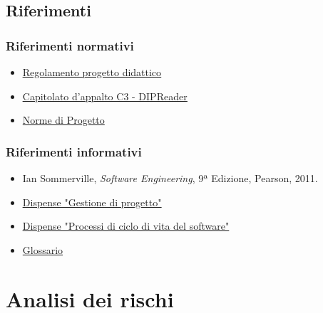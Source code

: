 \documentclass[a4paper,12pt]{article}
\begin{document}
\subsection{Riferimenti}
\subsubsection{Riferimenti normativi}
\begin{itemize}
    \item \href{https://www.math.unipd.it/~tullio/IS-1/2025/Dispense/PD1.pdf}{\ul{Regolamento progetto didattico}}  
    \item \href{https://www.math.unipd.it/~tullio/IS-1/2025/Progetto/C3.pdf}{\ul{Capitolato d'appalto C3 - DIPReader}}  
    \item \href{https://7-zpus.github.io/Docs/assets/2_RTB/DocumentiInterni/NormeDiProgetto.pdf}{Norme di Progetto} 
\end{itemize}
\subsubsection{Riferimenti informativi}
\begin{itemize}
    \item Ian Sommerville, \textit{Software Engineering}, 9ª Edizione, Pearson, 2011.
    \item \href{https://www.math.unipd.it/~tullio/IS-1/2025/Dispense/T04.pdf}{\ul{Dispense "Gestione di progetto"}}  
    \item \href{https://www.math.unipd.it/~tullio/IS-1/2025/Dispense/T02.pdf}{\ul{Dispense "Processi di ciclo di vita del software"}}  
    \item \href{https://7-zpus.github.io/Docs/assets/2_RTB/DocumentiInterni/Glossario.pdf}{Glossario} 
\end{itemize}



\section{Analisi dei rischi}
\end{document}
